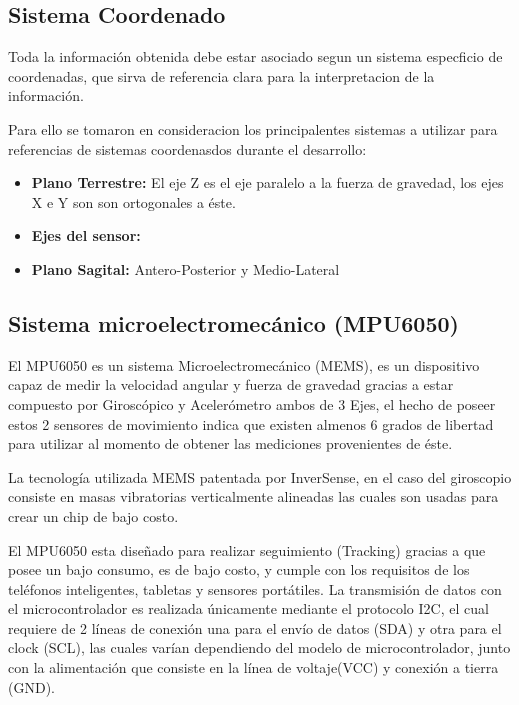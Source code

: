 \documentclass[12pt,a4paper]{article}
\begin{document}
			\subsection{Sistema Coordenado}
			Toda la información obtenida debe estar asociado segun un sistema especficio de coordenadas, que sirva de referencia clara para la interpretacion de la información.
			
			Para ello se tomaron en consideracion los principalentes sistemas a utilizar para referencias de sistemas coordenasdos durante el desarrollo:
			\begin{itemize}
				\item \textbf{Plano Terrestre:} El eje Z es el eje paralelo a la fuerza de gravedad, los ejes X e Y son son ortogonales a éste.
				\item \textbf{Ejes del sensor:}
				\item \textbf{Plano Sagital:} Antero-Posterior y Medio-Lateral
				
			\end{itemize}
			
			\subsection{Sistema microelectromecánico (MPU6050)}
			El MPU6050\cite{MPU6050} es un sistema Microelectromecánico (MEMS), es un dispositivo capaz de medir la velocidad angular y fuerza de gravedad gracias a estar compuesto por Giroscópico y Acelerómetro ambos de 3 Ejes, el hecho de poseer estos 2 sensores de movimiento indica que existen almenos 6 grados de libertad para utilizar al momento de obtener las mediciones provenientes de éste.
			
			La tecnología utilizada MEMS patentada por InverSense, en el caso del giroscopio consiste en masas vibratorias verticalmente alineadas las cuales son usadas para crear un chip de bajo costo.
			
			El MPU6050 esta diseñado para realizar seguimiento (Tracking) gracias a que posee un bajo consumo, es de bajo costo, y cumple con los requisitos de los teléfonos inteligentes, tabletas y sensores portátiles.
			La transmisión de datos con el microcontrolador es realizada únicamente mediante el protocolo I2C, el cual requiere de 2 líneas de conexión una para el envío de datos (SDA) y otra para el clock (SCL), las cuales varían dependiendo del modelo de microcontrolador, junto con la alimentación que consiste en la línea de voltaje(VCC) y conexión a tierra (GND).
			
\end{document}
